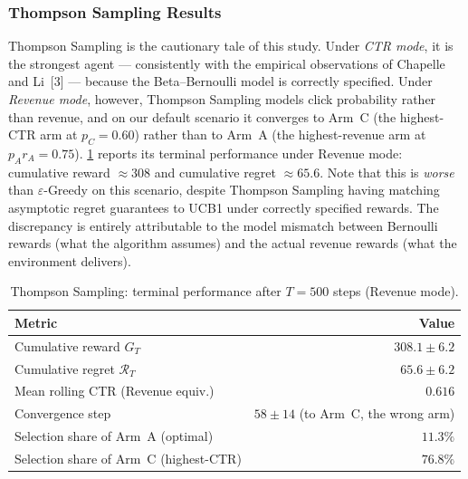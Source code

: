 \subsubsection{Thompson Sampling Results}
Thompson Sampling is the cautionary tale of this study. Under \emph{CTR mode}, it is the strongest agent --- consistently with the empirical observations of Chapelle and Li~[3] --- because the Beta--Bernoulli model is correctly specified. Under \emph{Revenue mode}, however, Thompson Sampling models click probability rather than revenue, and on our default scenario it converges to Arm~C (the highest-CTR arm at $p_C = 0.60$) rather than to Arm~A (the highest-revenue arm at $p_A r_A = 0.75$). \cref{tab:res-ts} reports its terminal performance under Revenue mode: cumulative reward $\approx 308$ and cumulative regret $\approx 65.6$. Note that this is \emph{worse} than $\varepsilon$-Greedy on this scenario, despite Thompson Sampling having matching asymptotic regret guarantees to UCB1 under correctly specified rewards. The discrepancy is entirely attributable to the model mismatch between Bernoulli rewards (what the algorithm assumes) and the actual revenue rewards (what the environment delivers).

\begin{table}[H]
\centering
\caption{Thompson Sampling: terminal performance after $T = 500$ steps (Revenue mode).}
\label{tab:res-ts}
\small
\begin{tabular}{lr}
\toprule
\textbf{Metric} & \textbf{Value}\\
\midrule
Cumulative reward $G_T$              & $308.1 \pm 6.2$\\
Cumulative regret $\mathcal{R}_T$    & $65.6 \pm 6.2$\\
Mean rolling CTR (Revenue equiv.)    & $0.616$\\
Convergence step                     & $58 \pm 14$ (to Arm~C, the wrong arm)\\
Selection share of Arm~A (optimal)   & $11.3\%$\\
Selection share of Arm~C (highest-CTR) & $76.8\%$\\
\bottomrule
\end{tabular}
\end{table}

